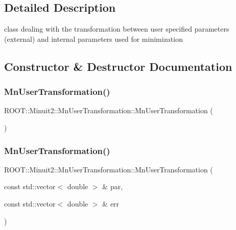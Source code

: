 \subsection{Detailed Description}
class dealing with the transformation between user specified parameters (external) and internal parameters used for minimization 

\subsection{Constructor \& Destructor Documentation}
\mbox{\label{classROOT_1_1Minuit2_1_1MnUserTransformation_aabec69c71600612db11554ed60a76e21}} 
\subsubsection{\texorpdfstring{MnUserTransformation()}{MnUserTransformation()}\hspace{0.1cm}{\footnotesize\ttfamily [1/6]}}
{\footnotesize\ttfamily R\+O\+O\+T\+::\+Minuit2\+::\+Mn\+User\+Transformation\+::\+Mn\+User\+Transformation (\begin{DoxyParamCaption}{ }\end{DoxyParamCaption})\hspace{0.3cm}{\ttfamily [inline]}}

\mbox{\label{classROOT_1_1Minuit2_1_1MnUserTransformation_a75c58c9381f8c42adcee7319d2671918}} 
\subsubsection{\texorpdfstring{MnUserTransformation()}{MnUserTransformation()}\hspace{0.1cm}{\footnotesize\ttfamily [2/6]}}
{\footnotesize\ttfamily R\+O\+O\+T\+::\+Minuit2\+::\+Mn\+User\+Transformation\+::\+Mn\+User\+Transformation (\begin{DoxyParamCaption}\item[{const std\+::vector$<$ double $>$ \&}]{par,  }\item[{const std\+::vector$<$ double $>$ \&}]{err }\end{DoxyParamCaption})}

